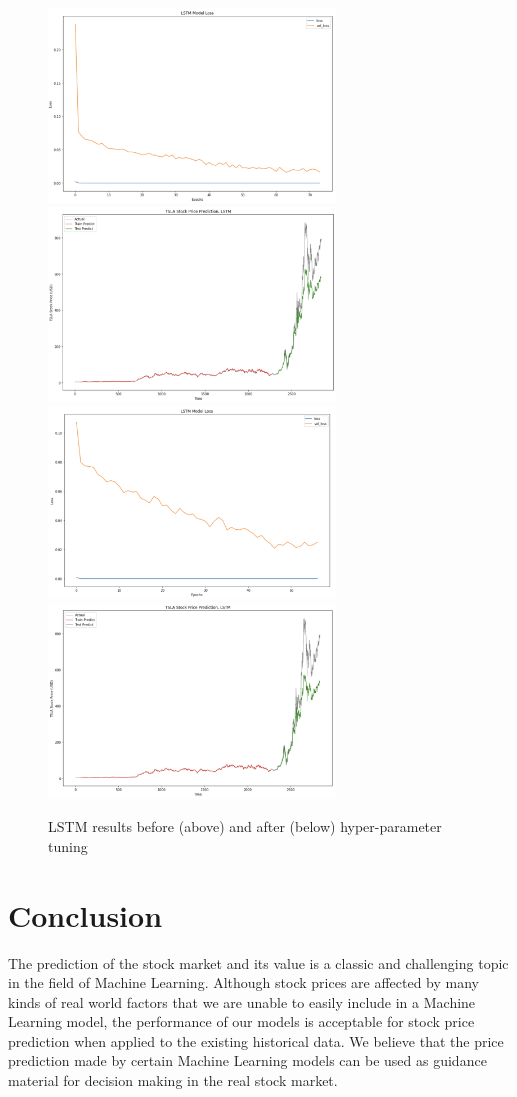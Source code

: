 \documentclass[12pt,a4paper]{article}
\begin{document}
\begin{figure}[h]
\centering
\caption{LSTM results before (above) and after (below) hyper-parameter tuning}
\includegraphics[width=3in]{./Figures/LSTM1.png}
\includegraphics[width=3in]{./Figures/LSTM2.png}
\includegraphics[width=3in]{./Figures/LSTM3.png}
\includegraphics[width=3in]{./Figures/LSTM4.png}
\end{figure}

\section{Conclusion}
The prediction of the stock market and its value is a classic and challenging topic in the field of Machine Learning. Although stock prices are affected by many kinds of real world factors that we are unable to easily include in a Machine Learning model, the performance of our models is acceptable for stock price prediction when applied to the existing historical data. We believe that the price prediction made by certain Machine Learning models can be used as guidance material for decision making in the real stock market. 
\end{document}
